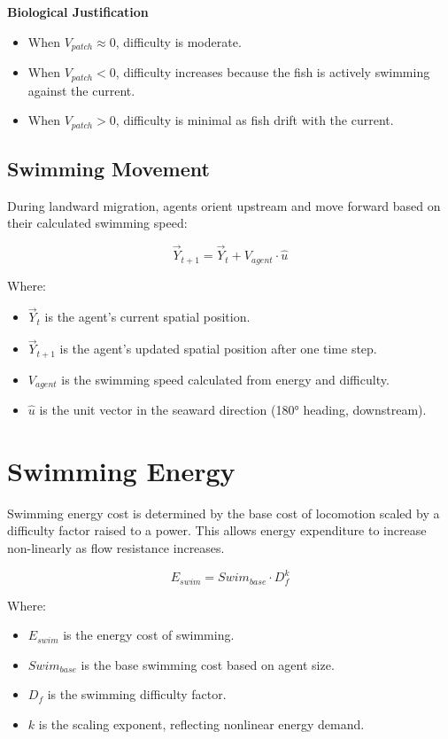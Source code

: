 \documentclass[
]{book}
\providecommand{\tightlist}{%
  \setlength{\itemsep}{0pt}\setlength{\parskip}{0pt}}
\begin{document}
\textbf{Biological Justification}

\begin{itemize}
\item
  When \(V_{patch} \approx 0\), difficulty is moderate.
\item
  When \(V_{patch} < 0\), difficulty increases because the fish is actively swimming against the current.
\item
  When \(V_{patch} > 0\), difficulty is minimal as fish drift with the current.
\end{itemize}

\subsection{Swimming Movement}\label{swimming-movement-1}

During landward migration, agents orient upstream and move forward based on their calculated swimming speed:

\[ \vec{Y}_{t+1} = \vec{Y}_t + V_{agent} \cdot \hat{u} \]

Where:

\begin{itemize}
\tightlist
\item
  \(\vec{Y}_t\) is the agent's current spatial position.
\item
  \(\vec{Y}_{t+1}\) is the agent's updated spatial position after one time step.
\item
  \(V_{agent}\) is the swimming speed calculated from energy and difficulty.
\item
  \(\hat{u}\) is the unit vector in the seaward direction (180° heading, downstream).
\end{itemize}

\section{Swimming Energy}\label{swimming-energy-1}

Swimming energy cost is determined by the base cost of locomotion scaled by a difficulty factor raised to a power. This allows energy expenditure to increase non-linearly as flow resistance increases.

\[ E_{swim} = Swim_{base} \cdot D_f^{k} \]

Where:

\begin{itemize}
\tightlist
\item
  \(E_{swim}\) is the energy cost of swimming.
\item
  \(Swim_{base}\) is the base swimming cost based on agent size.
\item
  \(D_f\) is the swimming difficulty factor.
\item
  \(k\) is the scaling exponent, reflecting nonlinear energy demand.
\end{itemize}
\end{document}

